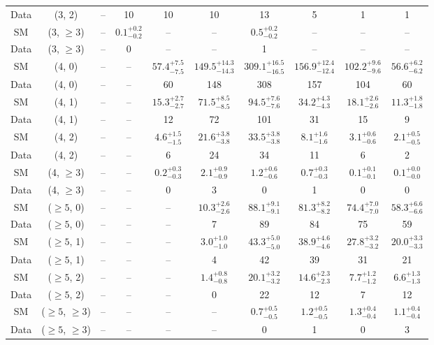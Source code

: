 \begin{table}[h!]
{\begin{tabular}{cccccccccc}
	Data & (3, 2) & -- & 10 & 10 & 10 & 13 & 5 & 1 & 1 \\[0.5ex] 
	SM & (3, $\ge3$) & -- & $0.1^{+ 0.2 }_{- 0.2 }$ & -- & -- & $0.5^{+ 0.2 }_{- 0.2 }$ & -- & -- & -- \\[0.5ex] 
	Data & (3, $\ge3$) & -- & 0 & -- & -- & 1 & -- & -- & -- \\[0.5ex] 
	SM & (4, 0) & -- & -- & $57.4^{+ 7.5 }_{- 7.5 }$ & $149.5^{+ 14.3 }_{- 14.3 }$ & $309.1^{+ 16.5 }_{- 16.5 }$ & $156.9^{+ 12.4 }_{- 12.4 }$ & $102.2^{+ 9.6 }_{- 9.6 }$ & $56.6^{+ 6.2 }_{- 6.2 }$ \\[0.5ex] 
	Data & (4, 0) & -- & -- & 60 & 148 & 308 & 157 & 104 & 60 \\[0.5ex] 
	SM & (4, 1) & -- & -- & $15.3^{+ 2.7 }_{- 2.7 }$ & $71.5^{+ 8.5 }_{- 8.5 }$ & $94.5^{+ 7.6 }_{- 7.6 }$ & $34.2^{+ 4.3 }_{- 4.3 }$ & $18.1^{+ 2.6 }_{- 2.6 }$ & $11.3^{+ 1.8 }_{- 1.8 }$ \\[0.5ex] 
	Data & (4, 1) & -- & -- & 12 & 72 & 101 & 31 & 15 & 9 \\[0.5ex] 
	SM & (4, 2) & -- & -- & $4.6^{+ 1.5 }_{- 1.5 }$ & $21.6^{+ 3.8 }_{- 3.8 }$ & $33.5^{+ 3.8 }_{- 3.8 }$ & $8.1^{+ 1.6 }_{- 1.6 }$ & $3.1^{+ 0.6 }_{- 0.6 }$ & $2.1^{+ 0.5 }_{- 0.5 }$ \\[0.5ex] 
	Data & (4, 2) & -- & -- & 6 & 24 & 34 & 11 & 6 & 2 \\[0.5ex] 
	SM & (4, $\ge3$) & -- & -- & $0.2^{+ 0.3 }_{- 0.3 }$ & $2.1^{+ 0.9 }_{- 0.9 }$ & $1.2^{+ 0.6 }_{- 0.6 }$ & $0.7^{+ 0.3 }_{- 0.3 }$ & $0.1^{+ 0.1 }_{- 0.1 }$ & $0.1^{+ 0.0 }_{- 0.0 }$ \\[0.5ex] 
	Data & (4, $\ge3$) & -- & -- & 0 & 3 & 0 & 1 & 0 & 0 \\[0.5ex] 
	SM & ($\ge5$, 0) & -- & -- & -- & $10.3^{+ 2.6 }_{- 2.6 }$ & $88.1^{+ 9.1 }_{- 9.1 }$ & $81.3^{+ 8.2 }_{- 8.2 }$ & $74.4^{+ 7.0 }_{- 7.0 }$ & $58.3^{+ 6.6 }_{- 6.6 }$ \\[0.5ex] 
	Data & ($\ge5$, 0) & -- & -- & -- & 7 & 89 & 84 & 75 & 59 \\[0.5ex] 
	SM & ($\ge5$, 1) & -- & -- & -- & $3.0^{+ 1.0 }_{- 1.0 }$ & $43.3^{+ 5.0 }_{- 5.0 }$ & $38.9^{+ 4.6 }_{- 4.6 }$ & $27.8^{+ 3.2 }_{- 3.2 }$ & $20.0^{+ 3.3 }_{- 3.3 }$ \\[0.5ex] 
	Data & ($\ge5$, 1) & -- & -- & -- & 4 & 42 & 39 & 31 & 21 \\[0.5ex] 
	SM & ($\ge5$, 2) & -- & -- & -- & $1.4^{+ 0.8 }_{- 0.8 }$ & $20.1^{+ 3.2 }_{- 3.2 }$ & $14.6^{+ 2.3 }_{- 2.3 }$ & $7.7^{+ 1.2 }_{- 1.2 }$ & $6.6^{+ 1.3 }_{- 1.3 }$ \\[0.5ex] 
	Data & ($\ge5$, 2) & -- & -- & -- & 0 & 22 & 12 & 7 & 12 \\[0.5ex] 
	SM & ($\ge5$, $\ge3$) & -- & -- & -- & -- & $0.7^{+ 0.5 }_{- 0.5 }$ & $1.2^{+ 0.5 }_{- 0.5 }$ & $1.3^{+ 0.4 }_{- 0.4 }$ & $1.1^{+ 0.4 }_{- 0.4 }$ \\[0.5ex] 
	Data & ($\ge5$, $\ge3$) & -- & -- & -- & -- & 0 & 1 & 0 & 3 \\[0.5ex] 
	\hline
	\hline
\end{tabular}}
\end{table}
